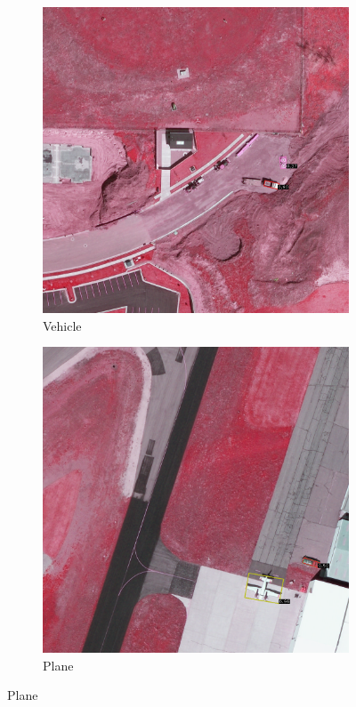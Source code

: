 \begin{figure}[h!]
    \begin{subfigure}[t]{0.38\textwidth}
        \centering
        \includegraphics[width=\linewidth]{images/015Results/02perm_exp/comp_images/irgb/427.png}
        \caption{Vehicle}
    \end{subfigure}
    \begin{subfigure}[t]{0.38\textwidth}
        \centering
        \includegraphics[width=\linewidth]{images/015Results/02perm_exp/comp_images/irgb/487.png}
        \caption{Plane}
    \end{subfigure}
    

\end{figure}
